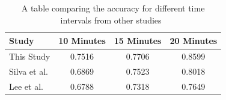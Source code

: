 \begin{table}[h]
    \centering
    \caption{A table comparing the accuracy for different time intervals from other studies~\citep{silva2018continuous, lee2020predicting}}
    \begin{tabular}{lccc}
        \toprule
        \textbf{Study} & \textbf{10 Minutes} & \textbf{15 Minutes} & \textbf{20 Minutes} \\
        \midrule
        This Study & 0.7516 & 0.7706 & 0.8599  \\
        Silva et al. & 0.6869 & 0.7523 & 0.8018 \\
        Lee et al. & 0.6788 & 0.7318 & 0.7649  \\
        \bottomrule
    \end{tabular}
    \label{tab:LitCompare}
\end{table}